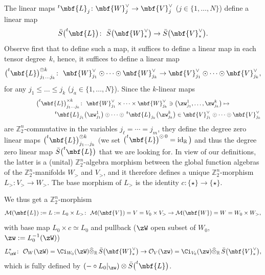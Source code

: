 \documentclass[10pt,a4paper]{amsart}
\newcommand{\op}[1]{\operatorname{#1}}
\newcommand{\R}{{\mathbb R}}
\newcommand{\Z}{{\mathbb Z}}
\def\cM{\cal M}
\def\cO{\mathcal{O}}
\def\cM{\mathcal{M}}
\newcommand{\0}{\otimes}
\newcommand{\id}{\op{id}}
\numberwithin{equation}{section}
\providecommand{\cal}{\mathcal}
\begin{document}
The linear maps $^t\mbf{L}_j\colon \mbf{W}_j^\vee\to \mbf{V}_j^\vee$ ($j\in\{1,\dots, N\}$) define a linear map
\[
{\bar S}\big(^t\mbf{L}\big)\colon\ {\bar S}\big(\mbf{W}_*^\vee\big)\to {\bar S}\big(\mbf{V}_*^\vee\big).
\]
Observe first that to define such a map, it suffices to define a linear map in each tensor degree~$k$, hence, it suffices to define a linear map
\[
\big(^t\mbf{L}\big)^{\odot k}_{j_1\dots j_k}\colon\ \mbf{W}_{j_1}^\vee\odot\cdots\odot\mbf{W}_{j_k}^\vee \to\mbf{V}_{j_1}^\vee\odot\cdots\odot\mbf{V}_{j_k}^\vee,
\]
for any $j_1\le\dots \le j_k$ ($j_a\in\{1,\dots,N\}$). Since the $k$-linear maps
\begin{gather*}
\big(^t\mbf{L}\big)^{\times k}_{j_1\dots j_k}\colon\ \mbf{W}_{j_1}^\vee\times\cdots\times\mbf{W}_{j_k}^\vee\ni \big(\zw^1_{j_1},\dots,\zw^k_{j_k}\big)\mapsto
\\ \hphantom{\big(^t\mbf{L}\big)^{\times k}_{j_1\dots j_k}\colon\ }
^t\mbf{L}_{j_1}\big(\zw^1_{j_1}\big)\odot\cdots\odot\, ^t\mbf{L}_{j_k}\big(\zw^k_{j_k}\big)\in\mbf{V}_{j_1}^\vee\odot\cdots\odot\mbf{V}_{j_k}^\vee
\end{gather*}
are $\Z_2^n$-commutative in the variables $j_\ell=\cdots=j_m$, they define the degree zero linear maps $\big(^t\mbf{L}\big)^{\odot k}_{j_1\dots j_k}$ $\big($we set $\big(^t\mbf{L}\big)^{\odot\, 0}=\id_\R\big)$ and thus the degree zero linear map $\bar S\big(^t\mbf{L}\big)$ that we are looking for. In view of our definitions, the latter is a (unital) $\Z_2^n$-algebra morphism between the global function algebras of the $\Z_2^n$-manifolds $W_>$ and $V_>$, and it therefore defines a unique $\Z_2^n$-morphism $L_>\colon V_>\to W_>$. The base morphism of $L_>$ is the identity $c\colon \{\star\}\to\{\star\}$.

We thus get a $\Z_2^n$-morphism
\begin{gather}\label{ML}
\cM(\mbf{L}):=L:=L_0\times L_>\colon\ \cM(\mbf{V})=V=V_0\times V_>\to \cM(\mbf{W})=W=W_0\times W_>,
\end{gather}
with base map $L_0\times c\simeq L_0$ and pullback ($\zW$ open subset of $W_0$, $\zw:=L_0^{-1}(\zW)$)
\begin{gather}\label{PullProd}
L^*_\zW\colon\ \cO_{W}(\zW)=\Ci_{W_0}(\zW)\widehat{\otimes}_\R\,\bar S\big(\mbf{W}^\vee_*\big)\to \cO_{V}(\zw)=\Ci_{V_0}(\zw)\widehat{\otimes}_\R\,\bar S\big(\mbf{V}^\vee_*\big),
\end{gather}
which is fully defined by $(-\circ L_0|_\zw)\otimes \bar S\big(^t\mbf{L}\big)$.
\end{document}

